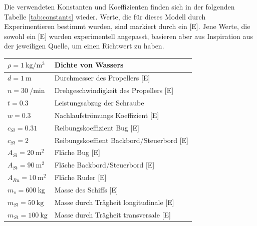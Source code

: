 \documentclass[]{iat}
\begin{document}
Die verwendeten Konstanten und Koeffizienten finden sich in der folgenden Tabelle \ref{tab:constants} wieder. Werte, die für dieses Modell durch Experimentieren bestimmt wurden, sind markiert durch ein [E]. Jene Werte, die sowohl ein [E] wurden experimentell angepasst, basieren aber aus Inspiration aus der jeweiligen Quelle, um einen Richtwert zu haben.
\begin{table}[H]
    \begin{tabular}{l|l}
        $\rho = \SI{1}{\kg\per\cubic\m}$ & Dichte von Wassers                                                                 \\ \hline
        $d = \SI{1}{\m}$                 & Durchmesser des Propellers [E]                                                     \\ \hline
        $n = \SI{30}{\per\minute}$       & Drehgeschwindigkeit des Propellers [E]                                             \\ \hline
        $t = 0.3$                        & Leistungsabzug der Schraube \cite[]{Zelazny_2014} \cite[]{Kulczyk_Tabaczek_2014_2} \\ \hline
        $w = 0.3$                        & Nachlaufströmungs Koeffizient [E] \cite[]{Zelazny_2014}                            \\ \hline
        $c_{Sl} = 0.31$                  & Reibungskoeffizient Bug [E]                                                        \\ \hline
        $c_{St} = 2$                     & Reibungskoeffient Backbord/Steuerbord [E]                                          \\ \hline
        $A_{Sl} = \SI{20}{\m\squared}$   & Fläche Bug [E]                                                                     \\ \hline
        $A_{St} = \SI{90}{\m\squared}$   & Fläche Backbord/Steuerbord [E]                                                     \\ \hline
        $A_{Ru} = \SI{10}{\m\squared}$   & Fläche Ruder [E]                                                                   \\ \hline
        $m_s = \SI{600}{\kg}$            & Masse des Schiffs [E]                                                              \\ \hline
        $m_{Sl} = \SI{50}{\kg}$          & Masse durch Trägheit longitudinale [E]                                             \\ \hline
        $m_{St} = \SI{100}{\kg}$         & Masse durch Trägheit transversale [E]                                              \\ \hline

\end{tabular}
\end{table}
\end{document}
